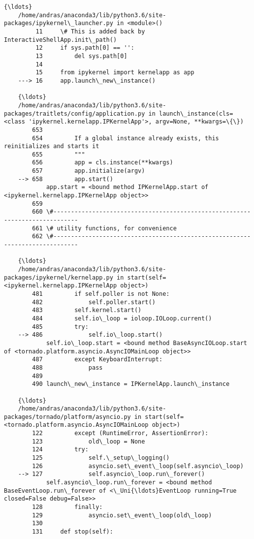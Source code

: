 \documentclass[11pt]{article}
\begin{document}
\begin{Verbatim}[commandchars=\\\{\}]
    {\ldots}
    /home/andras/anaconda3/lib/python3.6/site-packages/ipykernel\_launcher.py in <module>()
         11     \# This is added back by InteractiveShellApp.init\_path()
         12     if sys.path[0] == '':
         13         del sys.path[0]
         14 
         15     from ipykernel import kernelapp as app
    ---> 16     app.launch\_new\_instance()
    
    {\ldots}
    /home/andras/anaconda3/lib/python3.6/site-packages/traitlets/config/application.py in launch\_instance(cls=<class 'ipykernel.kernelapp.IPKernelApp'>, argv=None, **kwargs=\{\})
        653 
        654         If a global instance already exists, this reinitializes and starts it
        655         """
        656         app = cls.instance(**kwargs)
        657         app.initialize(argv)
    --> 658         app.start()
            app.start = <bound method IPKernelApp.start of <ipykernel.kernelapp.IPKernelApp object>>
        659 
        660 \#-----------------------------------------------------------------------------
        661 \# utility functions, for convenience
        662 \#-----------------------------------------------------------------------------
    
    {\ldots}
    /home/andras/anaconda3/lib/python3.6/site-packages/ipykernel/kernelapp.py in start(self=<ipykernel.kernelapp.IPKernelApp object>)
        481         if self.poller is not None:
        482             self.poller.start()
        483         self.kernel.start()
        484         self.io\_loop = ioloop.IOLoop.current()
        485         try:
    --> 486             self.io\_loop.start()
            self.io\_loop.start = <bound method BaseAsyncIOLoop.start of <tornado.platform.asyncio.AsyncIOMainLoop object>>
        487         except KeyboardInterrupt:
        488             pass
        489 
        490 launch\_new\_instance = IPKernelApp.launch\_instance
    
    {\ldots}
    /home/andras/anaconda3/lib/python3.6/site-packages/tornado/platform/asyncio.py in start(self=<tornado.platform.asyncio.AsyncIOMainLoop object>)
        122         except (RuntimeError, AssertionError):
        123             old\_loop = None
        124         try:
        125             self.\_setup\_logging()
        126             asyncio.set\_event\_loop(self.asyncio\_loop)
    --> 127             self.asyncio\_loop.run\_forever()
            self.asyncio\_loop.run\_forever = <bound method BaseEventLoop.run\_forever of <\_Uni{\ldots}EventLoop running=True closed=False debug=False>>
        128         finally:
        129             asyncio.set\_event\_loop(old\_loop)
        130 
        131     def stop(self):
    

\end{Verbatim}
\end{document}

